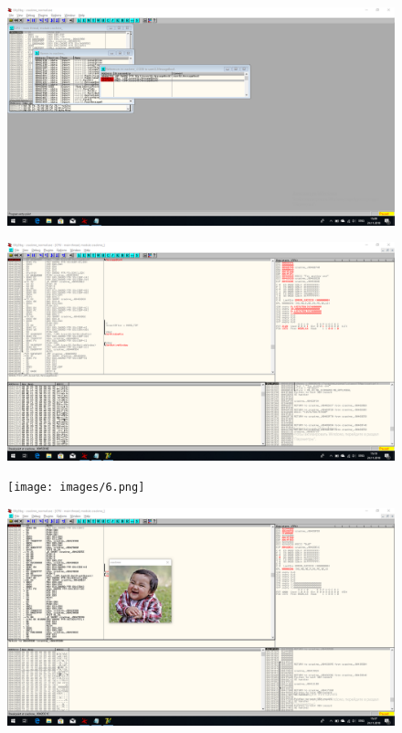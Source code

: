 \begin{figure}
	\centering
	\includegraphics[width=.8\textwidth]{images/4.png}
\end{figure}

\begin{figure}
	\centering
	\includegraphics[width=.8\textwidth]{images/5.png}
\end{figure}

\begin{figure}
	\centering
	\texttt{[image: images/6.png]}
\end{figure}

\begin{figure}
	\centering
	\includegraphics[width=.8\textwidth]{images/7.png}
\end{figure}
